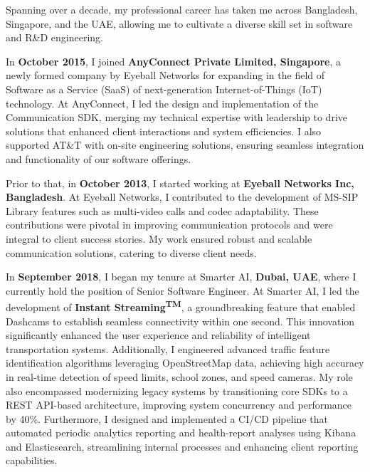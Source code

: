 \documentclass[11pt]{article}
\newif\ifshowsections
\begin{document}
\ifshowsections\section*{Professional Experience}\fi

Spanning over a decade, my professional career has taken me across Bangladesh, Singapore, and the UAE,
allowing me to cultivate a diverse skill set in software and R\&D engineering.

In \textbf{October 2015}, I joined \textbf{AnyConnect Private Limited, Singapore}, a newly formed company by Eyeball
Networks for expanding in the field of Software as a Service (SaaS) of next-generation Internet-of-Things
(IoT) technology. At AnyConnect, I led the design and implementation of the Communication SDK,
merging my technical expertise with leadership to drive solutions that enhanced client interactions and
system efficiencies. I also supported AT\&T with on-site engineering solutions, ensuring seamless integration and
functionality of our software offerings.

Prior to that, in \textbf{October 2013}, I started working at \textbf{Eyeball Networks Inc, Bangladesh}. At
Eyeball Networks, I contributed to the development of MS-SIP Library features such as multi-video calls and
codec adaptability. These contributions were pivotal in improving communication protocols and were integral
to client success stories. My work ensured robust and scalable communication solutions, catering to diverse
client needs.

In \textbf{September 2018}, I began my tenure at Smarter AI, \textbf{Dubai, UAE}, where I currently hold the position
of Senior Software Engineer. At Smarter AI, I led the development of \textbf{Instant Streaming\textsuperscript{TM}},
a groundbreaking feature that enabled Dashcams to establish seamless connectivity within one second. This
innovation significantly enhanced the user experience and reliability of intelligent transportation systems.
Additionally, I engineered advanced traffic feature identification algorithms leveraging OpenStreetMap data,
achieving high accuracy in real-time detection of speed limits, school zones, and speed cameras. My role also
encompassed modernizing legacy systems by transitioning core SDKs to a REST API-based architecture,
improving system concurrency and performance by 40\%. Furthermore, I designed and implemented a CI/CD pipeline
that automated periodic analytics reporting and health-report analyses using Kibana and Elasticsearch,
streamlining internal processes and enhancing client reporting capabilities.
\end{document}
